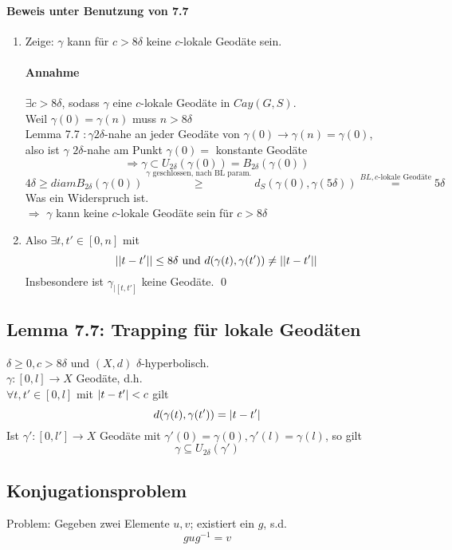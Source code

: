 \documentclass{article}
\begin{document}
\paragraph{Beweis unter Benutzung von 7.7}
\begin{enumerate}
	\item Zeige: $\gamma$ kann für $c > 8\delta$ keine $c$-lokale Geodäte sein.\\
	\paragraph{Annahme} $\exists c > 8 \delta$, sodass $\gamma$ eine $c$-lokale Geodäte in $Cay(G,S)$.\\
	Weil $\gamma(0) = \gamma(n)$ muss $n > 8\delta$\\
	Lemma 7.7 $: \gamma 2\delta$-nahe an jeder Geodäte von $\gamma(0) \rightarrow \gamma(n) = \gamma(0)$,\\
	also ist $\gamma$ $2\delta$-nahe am Punkt $\gamma(0) = $ konstante Geodäte\\
	\[\Longrightarrow \gamma \subset U_{2\delta}(\gamma(0)) = B_{2\delta}(\gamma(0)) \]
	\[ 4\delta \geq diam B_{2\delta}(\gamma(0)) \overset{\gamma \text{ geschlossen, nach BL param.}}{\geq} d_S(\gamma(0), \gamma(5\delta)) \overset{BL, c\text{-lokale Geodäte}}{=} 5\delta \]
	Was ein Widerspruch ist.\\
	$\Longrightarrow$ $\gamma$ kann keine $c$-lokale Geodäte sein für $c > 8\delta$
	\item Also $\exists t, t' \in [0,n]$ mit
	\[ \left|\left|t - t'\right|\right| \leq 8\delta \text{ und } d(\gamma(t), \gamma(t')) \neq \left|\left|t -t'\right|\right| \]
	Insbesondere ist $\gamma_{|[t,t']}$ keine Geodäte. \qed
\end{enumerate}


\subsection{Lemma 7.7: Trapping für lokale Geodäten}
$\delta \geq 0, c > 8 \delta$ und $(X,d)$ $\delta$-hyperbolisch.\\
$\gamma:[0,l] \rightarrow X$  Geodäte, d.h.\\
$\forall t, t' \in [0,l]$ mit $\left|t - t'\right| < c$ gilt
\[d(\gamma(t), \gamma(t')) = \left|t -t'\right|\]
Ist $\gamma':[0,l'] \rightarrow X$ Geodäte mit $\gamma'(0) = \gamma(0), \gamma'(l) = \gamma(l)$, so gilt
\[\gamma \subseteq U_{2\delta}(\gamma') \]


\subsection{Konjugationsproblem}
Problem: Gegeben zwei Elemente $u,v$; existiert ein $g$, s.d.
\[gug^{-1} =v \]
\end{document}

